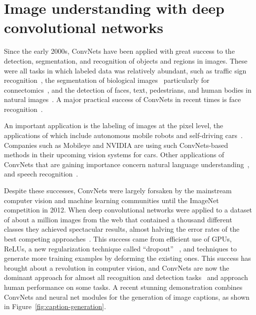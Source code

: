 \documentclass[10pts]{article}
\newcommand{\citep}[1]{\cite{#1}}
\begin{document}
\section{Image understanding with deep convolutional networks}

Since the early 2000s, ConvNets have been applied with great 
success to the detection, segmentation, and
recognition of objects and regions in images. These were all
tasks in which labeled data was relatively abundant, such as traffic
sign recognition~\cite{Ciresan-et-al-2012}, the
segmentation of biological images~\cite{ning-05} particularly for
connectomics~\cite{Turaga2010}, and the detection of faces, text,
pedestrians, and human bodies in natural
images~\cite{vaillant-monrocq-lecun-94,nowlan-platt-95,garcia-delakis-04,osadchy-07,sermanet-cvpr-13,tompson-cvpr-15}.
A major practical success of ConvNets in recent times is face
recognition~\citep{Taigman-et-al-CVPR2014}. 

An important application is the labeling of images at the pixel level,
the applications of which include autonomous mobile robots and
self-driving cars~\cite{hadsell-jfr-09,farabet-icml-12}. Companies
such as Mobileye and NVIDIA are using such ConvNets-based methods in
their upcoming vision systems for cars.  Other applications of
ConvNets that are gaining importance concern natural language
understanding~\citep{collobert:2011b}, and speech
recognition~\cite{Sainath-et-al-ICASSP2013}.

Despite these successes, ConvNets were largely forsaken by the
mainstream computer vision and machine learning communities until the
ImageNet competition in 2012.  When deep convolutional networks were
applied to a dataset of about a million images from the web that
contained a thousand different classes they achieved spectacular
results, almost halving the error rates of the best competing
approaches~\citep{Krizhevsky-2012-small}.  This success came from
efficient use of GPUs, ReLUs, a new regularization technique
called ``dropout'' ~\citep{Srivastava14}, and techniques to
generate more training examples by deforming the existing ones.
This success has brought about a
revolution in computer vision, and ConvNets are now the dominant
approach for almost all recognition and detection
tasks~\citep{sermanet-iclr-14,girshick-cvpr-2014,Taigman-et-al-CVPR2014,simonyan-arxiv-2014,szegedy-2014,tompson-cvpr-15}
and approach human performance on some tasks. A recent stunning
demonstration combines ConvNets and neural net modules for the
generation of image captions, as shown in
Figure~\ref{fig:caption-generation}.
\end{document}
